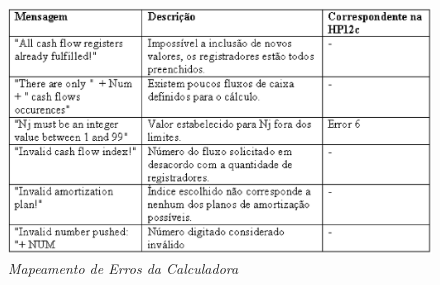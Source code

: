 \begin{figure}[!h]
\includegraphics[scale = .7]{tabErro2.eps}
\caption{\it Mapeamento de Erros da Calculadora}
\label{tabErros2}
\end{figure}